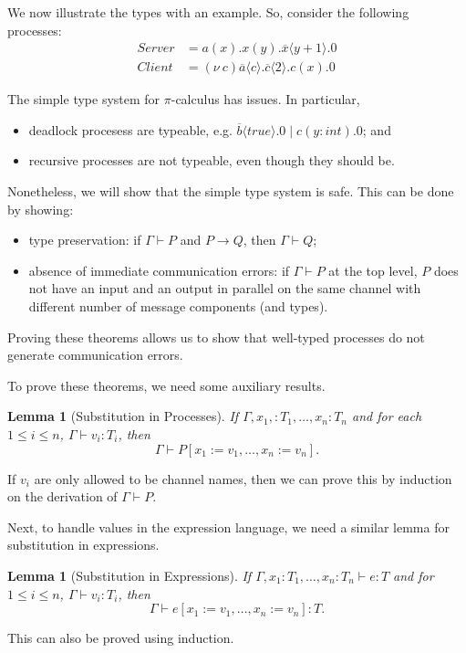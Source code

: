 \documentclass[a4paper, openany]{memoir}
\newtheorem{lemma}[proposition]{Lemma}
\theoremstyle{definition}
\begin{document}
    We now illustrate the types with an example. So, consider the following processes:
    \begin{align*}
        \textit{Server} &= a(x).x(y).\overline{x} \langle y + 1 \rangle.0 \\
        \textit{Client} &= (\nu \ c)\overline{a} \langle c \rangle.\overline{c} \langle 2 \rangle.c(x).0
    \end{align*}

    The simple type system for $\pi$-calculus has issues. In particular, 
    \begin{itemize}
        \item deadlock procesess are typeable, e.g. $\overline{b}\langle \textit{true} \rangle.0 \mid c(y \colon \textit{int}).0$; and
        \item recursive processes are not typeable, even though they should be.
    \end{itemize}
    
    Nonetheless, we will show that the simple type system is safe. This can be done by showing:
    \begin{itemize}
        \item type preservation: if $\Gamma \vdash P$ and $P \to Q$, then $\Gamma \vdash Q$;
        \item absence of immediate communication errors: if $\Gamma \vdash P$ at the top level, $P$ does not have an input and an output in parallel on the same channel with different number of message components (and types).
    \end{itemize}
    Proving these theorems allows us to show that well-typed processes do not generate communication errors.

    To prove these theorems, we need some auxiliary results.
    \begin{lemma}[Substitution in Processes]
        If $\Gamma, x_1, \colon T_1, \dots, x_n \colon T_n$ and for each $1 \leq i \leq n$, $\Gamma \vdash v_i \colon T_i$, then 
        \[\Gamma \vdash P[x_1 := v_1, \dots, x_n := v_n].\]
    \end{lemma}
    \noindent If $v_i$ are only allowed to be channel names, then we can prove this by induction on the derivation of $\Gamma \vdash P$.

    Next, to handle values in the expression language, we need a similar lemma for substitution in expressions.
    \begin{lemma}[Substitution in Expressions]
        If $\Gamma, x_1 \colon T_1, \dots, x_n \colon T_n \vdash e \colon T$ and for $1 \leq i \leq n$, $\Gamma \vdash v_i \colon T_i$, then
        \[\Gamma \vdash e[x_1 := v_1, \dots, x_n := v_n] \colon T.\]
    \end{lemma}
    \noindent This can also be proved using induction.
\end{document}
